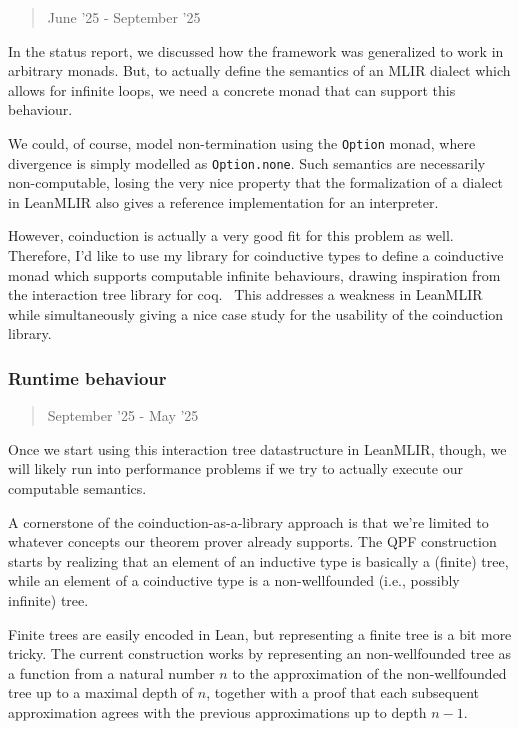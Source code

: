 \documentclass[a4paper]{scrartcl}
\begin{document}
\begin{quote}
June '25 - September  '25
\end{quote}

In the status report, we discussed how the framework was generalized to
work in arbitrary monads. But, to actually define the semantics of an
MLIR dialect which allows for infinite loops, we need a concrete monad
that can support this behaviour.

We could, of course, model non-termination using the \texttt{Option}
monad, where divergence is simply modelled as \texttt{Option.none}. Such
semantics are necessarily non-computable, losing the very nice property
that the formalization of a dialect in LeanMLIR also gives a reference
implementation for an interpreter.

However, coinduction is actually a very good fit for this problem as well.
Therefore, I'd like to use my library for coinductive types to define a
coinductive monad which supports computable infinite behaviours, drawing
inspiration from the interaction tree library for coq.~\cite{xiaInteractionTreesRepresenting2020}
This addresses a
weakness in LeanMLIR while simultaneously giving a nice case study for
the usability of the coinduction library.

\subsubsection{Runtime behaviour}\label{runtime-behaviour}
\begin{quote}
September '25 - May '25
\end{quote}

Once we start using this interaction tree datastructure in LeanMLIR, though, 
we will likely run into performance problems if we try to actually execute our computable semantics.

A cornerstone of the coinduction-as-a-library approach is that we're
limited to whatever concepts our theorem prover already supports. The
QPF construction starts by realizing that an element of an inductive
type is basically a (finite) tree, while an element of a coinductive
type is a non-wellfounded (i.e., possibly infinite) tree.

Finite trees are easily encoded in Lean, but representing a finite tree
is a bit more tricky. The current construction works by representing an
non-wellfounded tree as a function from a natural number \(n\) to the
approximation of the non-wellfounded tree up to a maximal depth of
\(n\), together with a proof that each subsequent approximation agrees
with the previous approximations up to depth \(n-1\).
\end{document}
